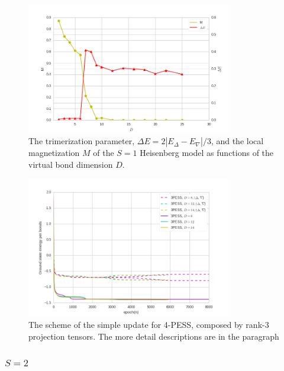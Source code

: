 \begin{figure}[H]
	\centering
	\includegraphics[width=0.80\textwidth]{figures/3pess_MDE.png}
	\caption[The trimerization parameter, $\Delta E = 2 |E_{\Delta}-E_{\nabla}| / 3$, and the local magnetization $M$ of the $S=1$ Heisenberg model as functions of the virtual bond dimension $D$]{The trimerization parameter, $\Delta E = 2 |E_{\Delta}-E_{\nabla}| / 3$, and the local magnetization $M$ of the $S=1$ Heisenberg model as functions of the virtual bond dimension $D$.}
	\label{fig4328}
\end{figure}

\begin{figure}[H]
	\centering
	\includegraphics[width=0.80\textwidth]{figures/3pess_GEN.png}
	\caption[The scheme of the simple update for 4-PESS, composed by rank-3 projection tensors.]{The scheme of the simple update for 4-PESS, composed by rank-3 projection tensors. The more detail descriptions are in the paragraph}
	\label{fig4329}
\end{figure}

\subsubsection{$S=2$}

